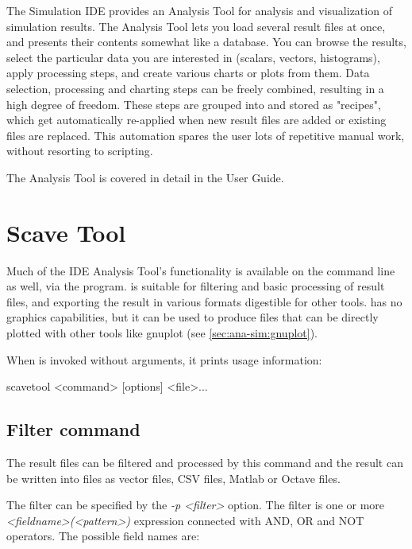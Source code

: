 The Simulation IDE provides an Analysis Tool for analysis and visualization
of simulation results. The Analysis Tool lets you load several result files
at once, and presents their contents somewhat like a database. You can
browse the results, select the particular data you are interested in
(scalars, vectors, histograms), apply processing steps, and create various
charts or plots from them. Data selection, processing and charting steps
can be freely combined, resulting in a high degree of freedom.
These steps are grouped into and stored as "recipes", which get automatically
re-applied when new result files are added or existing files are
replaced. This automation spares the user lots of repetitive manual work,
without resorting to scripting.

The Analysis Tool is covered in detail in the User Guide.


\section{Scave Tool}
\label{sec:ana-sim:scavetool}

Much of the IDE Analysis Tool's functionality is available on the command
line as well, via the  program.  is
suitable for filtering and basic processing of result files, and
exporting the result in various formats digestible for other tools.
 has no graphics capabilities, but it can be used
to produce files that can be directly plotted with other tools like
gnuplot (see \ref{sec:ana-sim:gnuplot}).

When  is invoked without arguments, it prints usage information:

\begin{commandline}
scavetool <command> [options] <file>...
\end{commandline}

\subsection{Filter command}

The result files can be filtered and processed by this command and the
result can be written into files as vector files, CSV files,
Matlab or Octave files.

The filter can be specified by the {\itshape -p <filter>} option.
The filter is one or more {\itshape <fieldname>(<pattern>)} expression
connected with AND, OR and NOT operators. The possible field names are:

